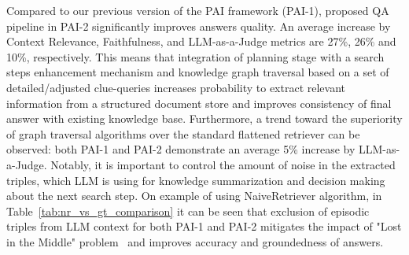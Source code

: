 
Compared to our previous version of the PAI framework (PAI-1), proposed QA pipeline in PAI-2 significantly improves answers quality. An average increase by Context Relevance, Faithfulness, and LLM-as-a-Judge metrics are 27\%, 26\% and 10\%, respectively. This means that integration of planning stage with a search steps enhancement mechanism and knowledge graph traversal based on a set of detailed/adjusted clue-queries increases probability to extract relevant information from a structured document store and improves consistency of final answer with existing knowledge base. Furthermore, a trend toward the superiority of graph traversal algorithms over the standard flattened retriever can be observed: both PAI-1 and PAI-2 demonstrate an average 5\% increase by LLM-as-a-Judge. Notably, it is important to control the amount of noise in the extracted triples, which LLM is using for knowledge summarization and decision making about the next search step. On example of using NaiveRetriever algorithm, in Table~\ref{tab:nr_vs_gt_comparison} it can be seen that exclusion of episodic triples from LLM context for both PAI-1 and PAI-2 mitigates the impact of "Lost in the Middle" problem~\cite{liu-etal-2024-lost} and improves accuracy and groundedness of answers.

